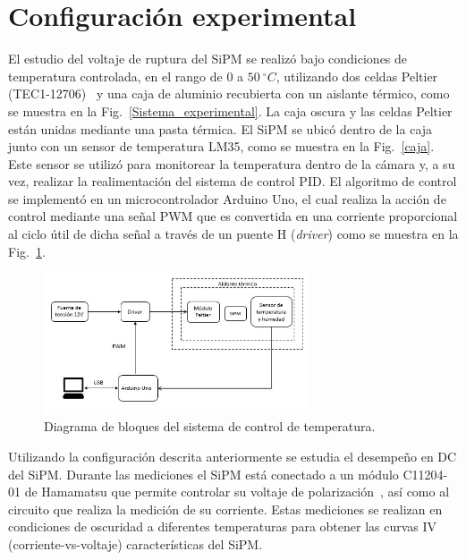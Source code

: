 \documentclass[runningheads]{llncs}
\begin{document}
\section{Configuración experimental}
El estudio del voltaje de ruptura del SiPM se realizó bajo condiciones de temperatura controlada, en el rango de $ 0 $ a $50~^\circ C$, utilizando dos celdas Peltier (TEC1-12706)~\cite{datasheet_Peltier} y una caja de aluminio recubierta con un aislante térmico, como se muestra en la Fig.~\ref{Sistema_experimental}. La caja oscura y las celdas Peltier están unidas mediante una pasta térmica. El SiPM se ubicó dentro de la caja junto con un sensor de temperatura LM35, como  se muestra en la Fig.~\ref{caja}. Este sensor se utilizó para monitorear la temperatura dentro de la cámara y, a su vez, realizar la realimentación del sistema de control PID. El algoritmo de control se implementó en un microcontrolador Arduino Uno, el cual realiza la acción de control mediante una señal PWM que es convertida en una corriente proporcional al ciclo útil de dicha señal a través de un puente H (\textit{driver}) como se muestra en la Fig.~\ref{sistema_termico}.

\begin{figure}[ht]
\includegraphics[width=0.7\textwidth]{Diagrama_Camara.JPG}
\centering
\caption{Diagrama de bloques del sistema de control de temperatura.} 
\label{sistema_termico}
\end{figure}

Utilizando la configuración descrita anteriormente se estudia el desempeño en DC del SiPM. Durante las mediciones el SiPM está conectado a un módulo C11204-01 de Hamamatsu que permite controlar su voltaje de polarización~\cite{fuente_hamamatsu}, así como al circuito que realiza la medición de su corriente. Estas mediciones se realizan en condiciones de oscuridad a diferentes temperaturas para obtener las curvas IV (corriente-vs-voltaje) características del SiPM. 
\end{document}
